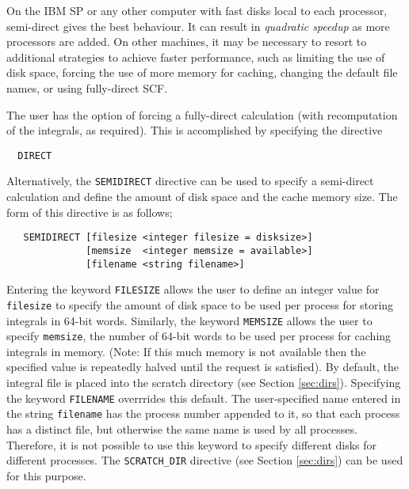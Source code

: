 On the IBM SP or any other computer with fast disks local to each
processor, semi-direct gives the best behaviour.  It can result in {\em
  quadratic speedup} as more processors are added.  On other machines,
it may be necessary to resort to additional strategies to achieve faster
performance, such as limiting the use of disk space, forcing the use of
more memory for caching, changing the default file names, or  using
fully-direct SCF.

The user has the option of forcing a fully-direct calculation (with
recomputation of the integrals, as required).  This is accomplished
by specifying the directive

\begin{verbatim}
  DIRECT
\end{verbatim}

Alternatively, the \verb+SEMIDIRECT+ directive can be used to
specify a semi-direct calculation and define
the amount of disk space and the cache memory size.  The form of this
directive is as follows;

\begin{verbatim}
   SEMIDIRECT [filesize <integer filesize = disksize>] 
              [memsize  <integer memsize = available>]
              [filename <string filename>]
\end{verbatim}
Entering the keyword \verb+FILESIZE+ allows the user to define
an integer value for \verb+filesize+ to specify the amount of disk space 
to be used per process
for storing integrals in 64-bit words.  Similarly, the keyword
\verb+MEMSIZE+ allows the user to specify \verb+memsize+,
the number of 64-bit words to be used per process for
caching integrals in memory. (Note: If this much memory is not available 
then the specified value is repeatedly halved until the request is satisfied).
By default, the integral file is placed into the scratch directory
(see Section \ref{sec:dirs}). Specifying the keyword \verb+FILENAME+ 
overrrides this default.  The user-specified name entered in the string
\verb+filename+ has the process number appended to it, so that
each process has a distinct file, but otherwise the same name is used by all
processes.  Therefore, it is not possible to use this keyword to specify
different disks for different processes.  The \verb+SCRATCH_DIR+ directive
(see Section \ref{sec:dirs}) can be used for this purpose.  


